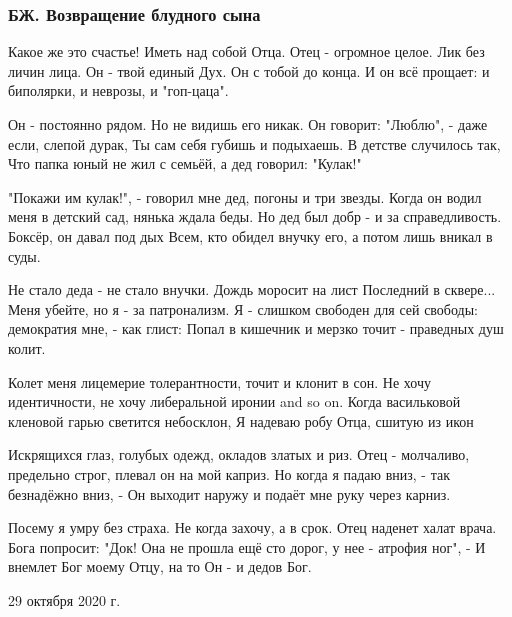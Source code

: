  
 
 

\subsubsection{БЖ. Возвращение блудного сына}


Какое же это счастье! Иметь над собой Отца.
Отец - огромное целое. Лик без личин лица.
Он - твой единый Дух. Он с тобой до конца.
И он всё прощает: и биполярки, и неврозы, и "гоп-цаца".

Он - постоянно рядом. Но не видишь его никак.
Он говорит: "Люблю", - даже если, слепой дурак,
Ты сам себя губишь и подыхаешь. В детстве случилось так,
Что папка юный не жил с семьёй, а дед говорил: "Кулак!"

"Покажи им кулак!", - говорил мне дед, погоны и три звезды.
Когда он водил меня в детский сад, нянька ждала беды.
Но дед был добр - и за справедливость. Боксёр, он давал под дых
Всем, кто обидел внучку его, а потом лишь вникал в суды.

Не стало деда - не стало внучки. Дождь моросит на лист
Последний в сквере... Меня убейте, но я - за патронализм.
Я - слишком свободен для сей свободы: демократия мне, - как глист:
Попал в кишечник и мерзко точит - праведных душ колит.

Колет меня лицемерие толерантности, точит и клонит в сон.
Не хочу идентичности, не хочу либеральной иронии and so on.
Когда васильковой кленовой гарью светится небосклон,
Я надеваю робу Отца, сшитую из икон

Искрящихся глаз, голубых одежд, окладов златых и риз.
Отец - молчаливо, предельно строг, плевал он на мой каприз.
Но когда я падаю вниз, - так безнадёжно вниз, -
Он выходит наружу и подаёт мне руку через карниз.

Посему я умру без страха. Не когда захочу, а в срок.
Отец наденет халат врача. Бога попросит: "Док!
Она не прошла ещё сто дорог, у нее - атрофия ног", -
И внемлет Бог моему Отцу, на то Он - и дедов Бог.

29 октября 2020 г.
